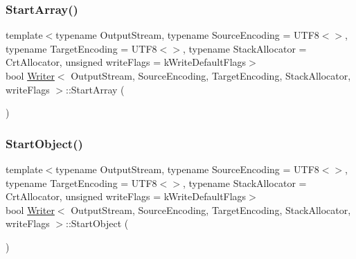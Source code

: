 \subsubsection{\texorpdfstring{Start\+Array()}{StartArray()}}
{\footnotesize\ttfamily template$<$typename Output\+Stream, typename Source\+Encoding = U\+T\+F8$<$$>$, typename Target\+Encoding = U\+T\+F8$<$$>$, typename Stack\+Allocator = Crt\+Allocator, unsigned write\+Flags = k\+Write\+Default\+Flags$>$ \\
bool \hyperlink{classWriter}{Writer}$<$ Output\+Stream, Source\+Encoding, Target\+Encoding, Stack\+Allocator, write\+Flags $>$\+::Start\+Array (\begin{DoxyParamCaption}{ }\end{DoxyParamCaption})\hspace{0.3cm}{\ttfamily [inline]}}

\mbox{\label{classWriter_aec3200b2fc80ec87d1c37f775256b2e1}} 
\subsubsection{\texorpdfstring{Start\+Object()}{StartObject()}}
{\footnotesize\ttfamily template$<$typename Output\+Stream, typename Source\+Encoding = U\+T\+F8$<$$>$, typename Target\+Encoding = U\+T\+F8$<$$>$, typename Stack\+Allocator = Crt\+Allocator, unsigned write\+Flags = k\+Write\+Default\+Flags$>$ \\
bool \hyperlink{classWriter}{Writer}$<$ Output\+Stream, Source\+Encoding, Target\+Encoding, Stack\+Allocator, write\+Flags $>$\+::Start\+Object (\begin{DoxyParamCaption}{ }\end{DoxyParamCaption})\hspace{0.3cm}{\ttfamily [inline]}}

\mbox{\label{classWriter_a8b4dc44f471403a83c9959575796ceab}} 
